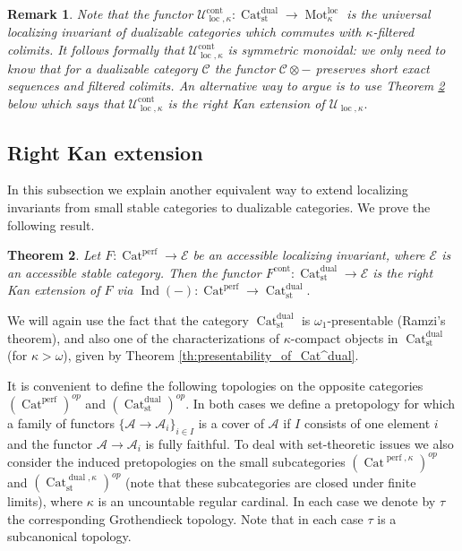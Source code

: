\documentclass[11pt,leqno]{amsart}
\newtheorem{theo}{Theorem}[section]
\newtheorem{remark}[theo]{Remark}
\numberwithin{equation}{section}
\newcommand{\Mot}{\operatorname{Mot}}
\newcommand{\Cat}{\operatorname{Cat}}
\newcommand{\loc}{\operatorname{loc}}
\newcommand{\cont}{\operatorname{cont}}
\newcommand{\st}{\operatorname{st}}
\newcommand{\dual}{\operatorname{dual}}
\newcommand{\cA}{{\mathcal A}}
\newcommand{\cC}{{\mathcal C}}
\newcommand{\cE}{{\mathcal E}}
\newcommand{\cU}{{\mathcal U}}
\newcommand{\perf}{\operatorname{perf}}
\newcommand{\Ind}{\operatorname{Ind}}
\begin{document}
\begin{remark}Note that the functor $\cU_{\loc,\kappa}^{\cont}:\Cat_{\st}^{\dual}\to\Mot^{\loc}_{\kappa}$ is the universal localizing invariant of dualizable categories which commutes with $\kappa$-filtered colimits. It follows formally that $\cU_{\loc,\kappa}^{\cont}$ is symmetric monoidal: we only need to know that for a dualizable category $\cC$ the functor $\cC\otimes-$ preserves short exact sequences and filtered colimits. An alternative way to argue is to use Theorem \ref{th:F_cont_as_right_Kan_extension} below which says that $\cU_{\loc,\kappa}^{\cont}$ is the right Kan extension of $\cU_{\loc,\kappa}.$\end{remark}

\subsection{Right Kan extension}
\label{ssec:F_cont_via_right_Kan_extension}

In this subsection we explain another equivalent way to extend localizing invariants from small stable categories to dualizable categories. We prove the following result.

\begin{theo}\label{th:F_cont_as_right_Kan_extension} Let $F:\Cat^{\perf}\to\cE$ be an accessible localizing invariant, where $\cE$ is an accessible stable category. Then the functor $F^{\cont}:\Cat_{\st}^{\dual}\to\cE$ is the right Kan extension of $F$ via $\Ind(-):\Cat^{\perf}\to\Cat_{\st}^{\dual}.$\end{theo}

We will again use the fact that the category $\Cat_{\st}^{\dual}$ is $\omega_1$-presentable (Ramzi's theorem), and also one of the characterizations of $\kappa$-compact objects in $\Cat_{\st}^{\dual}$ (for $\kappa>\omega$), given by Theorem \ref{th:presentability_of_Cat^dual}.

It is convenient to define the following topologies on the opposite categories $(\Cat^{\perf})^{op}$ and $(\Cat_{\st}^{\dual})^{op}.$  In both cases we define a pretopology for which a family of functors $\{\cA\to\cA_i\}_{i\in I}$ is a cover of $\cA$ if $I$ consists of one element $i$ and the functor $\cA\to\cA_i$ is fully faithful. To deal with set-theoretic issues we also consider the induced pretopologies on the small subcategories $(\Cat^{\perf,\kappa})^{op}$ and $(\Cat_{\st}^{\dual,\kappa})^{op}$ (note that these subcategories are closed under finite limits), where $\kappa$ is an uncountable regular cardinal. In each case we denote by $\tau$ the corresponding Grothendieck topology. Note that in each case $\tau$ is a subcanonical topology.
\end{document}
